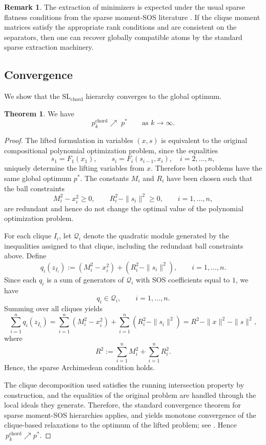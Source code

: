 \documentclass[11pt,a4paper]{article}
\theoremstyle{definition}
\newtheorem{theorem}{Theorem}[section]
\newtheorem*{remark}{Remark}
\begin{document}
\begin{remark}
    The extraction of minimizers is expected under the usual sparse flatness conditions from the sparse moment-SOS literature \cite{Waki2006,Lasserre2006,FantuzziFuentes2025}. If the clique moment matrices satisfy the appropriate rank conditions and are consistent on the separators, then one can recover globally compatible atoms by the standard sparse extraction machinery.
\end{remark}

\subsection{Convergence}

We show that the $\mathrm{SL}_{\mathrm{chord}}$ hierarchy converges to the global optimum. 

\begin{theorem}
We have
\[
p_k^{\mathrm{chord}} \nearrow \; p^*
\qquad \text{as } k\to\infty.
\]
\end{theorem}

\begin{proof}
The lifted formulation in variables $(x,s)$ is equivalent to the original compositional polynomial optimization problem, since the equalities
\[
s_1 = F_1(x_1), \qquad s_i = F_i(s_{i-1},x_i), \quad i=2,\dots,n,
\]
uniquely determine the lifting variables from $x$. Therefore both problems have the same global optimum $p^*$.
The constants $M_i$ and $R_i$ have been chosen such that the ball constraints 
\[
M_i^2-x_i^2\ge 0, \qquad R_i^2-\|s_i\|^2\ge 0, \qquad i=1,\dots,n,
\]
are redundant and hence do not change the optimal value of the polynomial optimization problem.


For each clique $I_i$, let $\mathcal Q_i$ denote the quadratic module generated by the
inequalities assigned to that clique, including the redundant ball constraints above. Define
\[
q_i(z_{I_i}) := (M_i^2-x_i^2) + (R_i^2-\|s_i\|^2), \qquad i=1,\dots,n.
\]
Since each $q_i$ is a sum of generators of $\mathcal Q_i$ with SOS coefficients equal to $1$,
we have
\[
q_i \in \mathcal Q_i, \qquad i=1,\dots,n.
\]
Summing over all cliques yields
\[
\sum_{i=1}^n q_i(z_{I_i})
= \sum_{i=1}^n (M_i^2-x_i^2) + \sum_{i=1}^n (R_i^2-\|s_i\|^2)
= R^2-\|x\|^2-\|s\|^2,
\]
where
\[
R^2 := \sum_{i=1}^n M_i^2 + \sum_{i=1}^n R_i^2.
\]
Hence, the sparse Archimedean condition holds.

The clique decomposition used satisfies the running intersection property by construction, and the equalities of the original problem are handled through the local ideals they generate. Therefore, the standard convergence theorem for sparse moment-SOS hierarchies applies, and yields monotone convergence of the clique-based relaxations to the optimum of the lifted problem; see \cite{Lasserre2006,Waki2006}. Hence
$\
p_k^{\mathrm{chord}} \nearrow p^*.
$
\end{proof}
\end{document}
